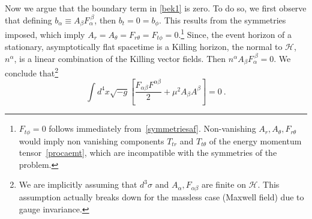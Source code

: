 \documentclass{article}
\numberwithin{equation}{section}
\begin{document}
Now we argue that the boundary term in  \eqref{bek1} is zero. To do so, we first observe that defining $b_\alpha\equiv A_\beta F_{\alpha}^{\ \beta}$, then $b_t=0=b_\phi$. This results from the symmetries imposed, which imply $A_r=A_\theta=F_{r\theta}=F_{t\phi}=0$.\footnote{$F_{t\phi}=0$ follows immediately from~\eqref{symmetriesaf}. Non-vanishing $A_r,A_\theta,F_{r\theta}$ would imply non vanishing components $T_{tr}$ and $T_{t\theta}$ of the energy momentum tensor~\eqref{procaemt}, which are incompatible with the symmetries of the problem.} 
Since, the event horizon of a stationary, asymptotically flat spacetime is a Killing horizon, the normal to $\mathcal{H}$, $n^\alpha$, 
is a linear combination of the Killing vector fields. Then $n^\alpha A_\beta F_{\alpha}^{\ \beta}=0$. 
%
We conclude that\footnote{We are implicitly assuming that $d^3\sigma$ and $A_\alpha,F_{\alpha\beta}$ are finite on $\mathcal{H}$. This assumption actually breaks down for the massless case (Maxwell field) due to gauge invariance.}
\begin{equation}
\int d^4x\sqrt{-g}\left[\frac{F_{\alpha\beta} F^{\alpha\beta}}{2}+\mu^2 A_\beta A^\beta\right]=0 \ .
\label{bek3}
\end{equation}
\end{document}
